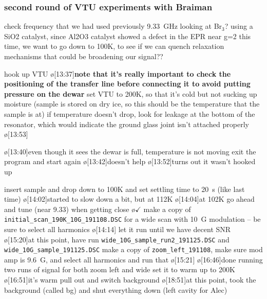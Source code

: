 \subsubsection{second round of VTU experiments with Braiman}
check frequency that we had used previously 9.33~GHz
looking at Br$_3$? using a SiO2 catalyst, since Al2O3 catalyst showed a defect in the EPR near g=2
this time, we want to go down to 100K, to see if we can quench relaxation mechanisms that could be broadening our signal??

hook up VTU
\o[13:37]{\textbf{note that it's really important to check the positioning of the transfer line before connecting it to avoid putting pressure on the dewar}}
set VTU to 200K, so that it's cold but not sucking up moisture (sample is stored on dry ice, so this should be the temperature that the sample is at)
if temperature doesn't drop, look for leakage at the bottom of the resonator, which would indicate the ground glass joint isn't attached properly
\o[13:53]{}
\begin{err}
    \o[13:40]{even though it sees the dewar is full, temperature is not moving}
    exit the program and start again
    \o[13:42]{doesn't help}
    \o[13:52]{turns out it wasn't hooked up}
\end{err}
insert sample and drop down to 100K and set settling time to 20~s (like last time)
\o[14:02]{started to slow down a bit, but at 112K}
\o[14:04]{at 102K}
go ahead and tune (near 9.33) when getting close
\o{$\checkmark$}
make a copy of \texttt{initial_scan_190K_10G_191108.DSC} for a wide scan with 10~G
modulation -- be sure to select all harmonics
\o[14:14]{}
let it run until we have decent SNR
\o[15:20]{at this point, have run \texttt{wide_10G_sample_run2_191125.DSC} and \texttt{wide_10G_sample_191125.DSC}}
make a copy of \texttt{zoom_left_191108}, make sure mod amp is 9.6~G, and select all harmonics and run that
\o[15:21]{}
\o[16:46]{done running two runs of signal for both zoom left and wide}
set it to warm up to 200K
\o[16:51]{it's warm}
pull out and switch background
\o[18:51]{at this point, took the background (called bg) and shut everything down (left cavity for Alec)}